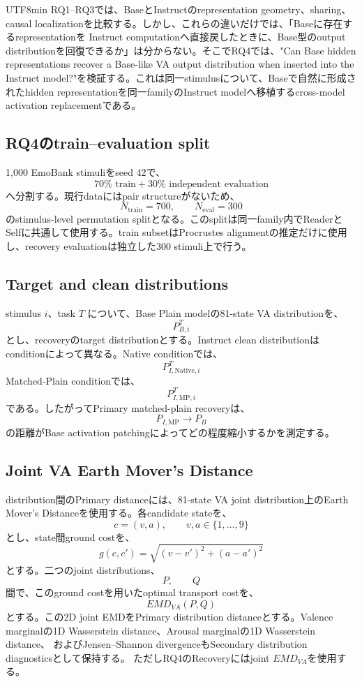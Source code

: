 \documentclass{article} %
\begin{document}
\begin{CJK*}{UTF8}{min}
RQ1--RQ3では、BaseとInstructのrepresentation geometry、sharing、causal localizationを比較する。しかし、これらの違いだけでは、「Baseに存在するrepresentationを
Instruct computationへ直接戻したときに、Base型のoutput distributionを回復できるか」は分からない。そこでRQ4では、"Can Base hidden representations recover a Base-like
VA output distribution when inserted into the Instruct model?"を検証する。これは同一stimulusについて、Baseで自然に形成されたhidden representationを同一familyのInstruct modelへ移植するcross-model activation replacementである。


\subsection{RQ4のtrain--evaluation split}

1,000 EmoBank stimuliをseed 42で、
\[
70\%\text{ train}
+
30\%\text{ independent evaluation}
\]
へ分割する。現行dataにはpair structureがないため、
\[
N_{\mathrm{train}}=700,
\qquad
N_{\mathrm{eval}}=300
\]
のstimulus-level permutation splitとなる。このsplitは同一family内でReaderとSelfに共通して使用する。train subsetはProcrustes alignmentの推定だけに使用し、recovery evaluationは独立した300 stimuli上で行う。


\subsection{Target and clean distributions}

stimulus \(i\)、task \(T\) について、Base Plain modelの81-state VA distributionを、
\[
P_{B,i}^{T}
\]
とし、recoveryのtarget distributionとする。Instruct clean distributionはconditionによって異なる。Native conditionでは、
\[
P_{I,\mathrm{Native},i}^{T}
\]
Matched-Plain conditionでは、
\[
P_{I,\mathrm{MP},i}^{T}
\]
である。したがってPrimary matched-plain recoveryは、
\[
P_{I,\mathrm{MP}}
\rightarrow
P_B
\]
の距離がBase activation patchingによってどの程度縮小するかを測定する。


\subsection{Joint VA Earth Mover's Distance}

distribution間のPrimary distanceには、81-state VA joint distribution上のEarth Mover's Distanceを使用する。各candidate stateを、
\[
c=(v,a),
\qquad
v,a\in\{1,\ldots,9\}
\]
とし、state間ground costを、
\[
g(c,c')
=
\sqrt{
(v-v')^2
+
(a-a')^2
}
\]
とする。二つのjoint distributions、
\[
P,
\qquad
Q
\]
間で、このground costを用いたoptimal transport costを、
\[
EMD_{VA}(P,Q)
\]
とする。この2D joint EMDをPrimary distribution distanceとする。Valence marginalの1D Wasserstein distance、Arousal marginalの1D Wasserstein distance、
およびJensen--Shannon divergenceもSecondary distribution diagnosticsとして保持する。
ただしRQ4のRecoveryにはjoint \(EMD_{VA}\)を使用する\citep{rubner2000earth}。



\end{CJK*}
\end{document}
